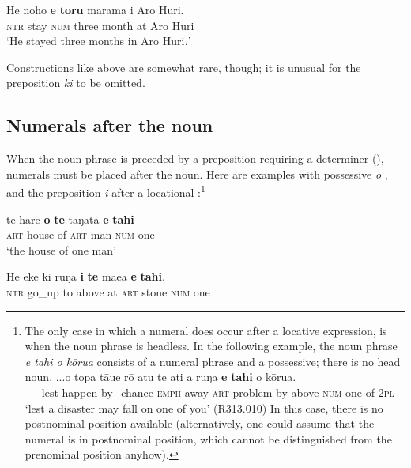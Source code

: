 \ea\label{ex:5.62}
\gll He noho \textbf{e} \textbf{toru} marama {\ꞌ}i Aro Huri. \\
\textsc{ntr} stay \textsc{num} three month at Aro Huri \\

\glt 
‘He stayed three months in Aro Huri\textit{.}’ \textstyleExampleref{[MsE-109.013]}
\z

Constructions like  above are somewhat rare, though; it is unusual for the preposition \textit{ki} to be omitted. 

\subsection{Numerals after the noun}\label{sec:5.4.2}
When the noun phrase is preceded by a preposition requiring a determiner (), numerals must be placed after the noun. Here are examples with possessive \textit{o} , and the preposition \textit{i} after a locational :\footnote{\label{fn:259}The only case in which a numeral does occur after a locative expression, is when the noun phrase is headless. In the following example, the noun phrase \textit{e tahi o kōrua} consists of a numeral phrase and a possessive; there is no head noun.
\ea
\gll 
...{\ꞌ}o topa tā{\ꞌ}ue rō atu te {\ꞌ}ati a ruŋa \textbf{e} \textbf{tahi} o kōrua.\\
  ~~~lest happen by\_chance \textsc{emph} away \textsc{art} problem by above \textsc{num} one of \textsc{2pl} \\
  \glt 
  ‘lest a disaster may fall on one of you’ (R313.010) \z
In this case, there is no postnominal position available (alternatively, one could assume that the numeral is in postnominal position, which cannot be distinguished from the prenominal position anyhow).}

\ea\label{ex:5.63}
\gll te hare \textbf{o} \textbf{te} taŋata \textbf{e} \textbf{tahi} \\
\textsc{art} house of \textsc{art} man \textsc{num} one \\

\glt 
‘the house of one man’ \textstyleExampleref{[Notes]}
\z

\ea\label{ex:5.64}
\gll He eke ki ruŋa \textbf{i} \textbf{te} mā{\ꞌ}ea \textbf{e} \textbf{tahi}.\\
\textsc{ntr} go\_up to above at \textsc{art} stone \textsc{num} one\\

